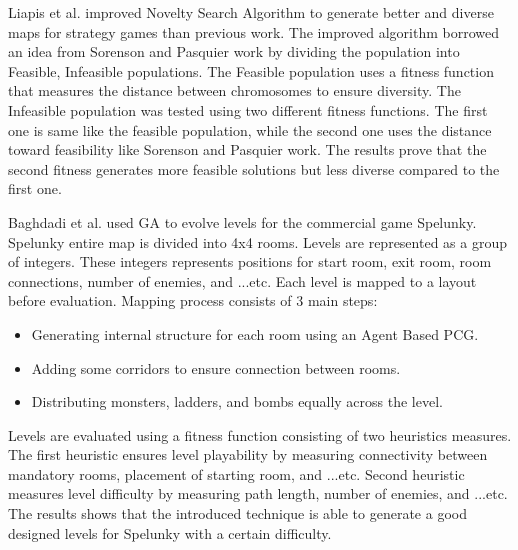 Liapis et al.\cite{noveltySearch} improved Novelty Search Algorithm to generate better and diverse maps for strategy games than previous work\cite{goodDiverseLevels}. The improved algorithm borrowed an idea from Sorenson and Pasquier work\cite{genericLevelFramework} by dividing the population into Feasible, Infeasible populations. The Feasible population uses a fitness function that measures the distance between chromosomes to ensure diversity. The Infeasible population was tested using two different fitness functions. The first one is same like the feasible population, while the second one uses the distance toward feasibility like Sorenson and Pasquier work\cite{genericLevelFramework}. The results prove that the second fitness generates more feasible solutions but less diverse compared to the first one.\\\par

Baghdadi et al.\cite{spelunkyLevelGeneration} used GA to evolve levels for the commercial game Spelunky\cite{spelunky}. Spelunky entire map is divided into 4x4 rooms. Levels are represented as a group of integers. These integers represents positions for start room, exit room, room connections, number of enemies, and ...etc. Each level is mapped to a layout before evaluation. Mapping process consists of 3 main steps:
\begin{itemize} \itemsep0pt \parskip0pt 
	\item Generating internal structure for each room using an Agent Based PCG.
	\item Adding some corridors to ensure connection between rooms.
	\item Distributing monsters, ladders, and bombs equally across the level.
\end{itemize}
Levels are evaluated using a fitness function consisting of two heuristics measures. The first heuristic ensures level playability by measuring connectivity between mandatory rooms, placement of starting room, and ...etc. Second heuristic measures level difficulty by measuring path length, number of enemies, and ...etc. The results shows that the introduced technique is able to generate a good designed levels for Spelunky with a certain difficulty.\\\par


